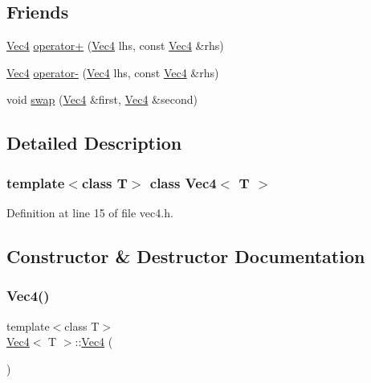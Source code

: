 \subsection*{Friends}
\begin{DoxyCompactItemize}
\item 
\mbox{\hyperlink{class_vec4}{Vec4}} \mbox{\hyperlink{class_vec4_a33771ecce1909f4a57691fe6c9fc6373}{operator+}} (\mbox{\hyperlink{class_vec4}{Vec4}} lhs, const \mbox{\hyperlink{class_vec4}{Vec4}} \&rhs)
\item 
\mbox{\hyperlink{class_vec4}{Vec4}} \mbox{\hyperlink{class_vec4_a31113e260c50ba3cd30e8a077e52de75}{operator-\/}} (\mbox{\hyperlink{class_vec4}{Vec4}} lhs, const \mbox{\hyperlink{class_vec4}{Vec4}} \&rhs)
\item 
void \mbox{\hyperlink{class_vec4_a5ecdc82e3fc8dff7b9d5926998a3ec39}{swap}} (\mbox{\hyperlink{class_vec4}{Vec4}} \&first, \mbox{\hyperlink{class_vec4}{Vec4}} \&second)
\end{DoxyCompactItemize}


\subsection{Detailed Description}
\subsubsection*{template$<$class T$>$\newline
class Vec4$<$ T $>$}



Definition at line 15 of file vec4.\+h.



\subsection{Constructor \& Destructor Documentation}
\mbox{\label{class_vec4_ad342af37b73f64d7cea0cef986f5c959}} 
\subsubsection{\texorpdfstring{Vec4()}{Vec4()}\hspace{0.1cm}{\footnotesize\ttfamily [1/4]}}
{\footnotesize\ttfamily template$<$class T$>$ \\
\mbox{\hyperlink{class_vec4}{Vec4}}$<$ T $>$\+::\mbox{\hyperlink{class_vec4}{Vec4}} (\begin{DoxyParamCaption}{ }\end{DoxyParamCaption})\hspace{0.3cm}{\ttfamily [inline]}}



